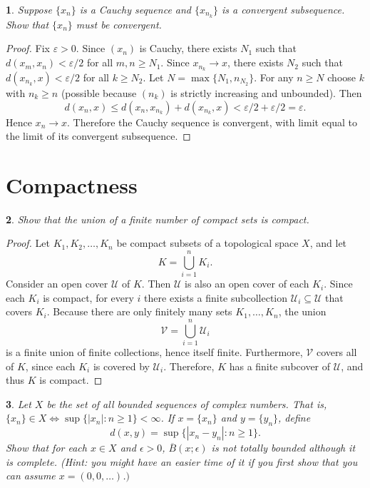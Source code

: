 \documentclass[12pt, a4paper]{report}
\theoremstyle{spaced}
\newtheorem{exercise}{}
\newcommand{\setexercise}[1]{\setcounter{exercise}{#1-1}}
\begin{document}
\setexercise{8}
\begin{exercise}
	Suppose $\{x_n\}$ is a Cauchy sequence and $\{x_{n_k}\}$ is a convergent subsequence.
	Show that $\{x_n\}$ must be convergent.
\end{exercise}

\begin{proof}
	Fix $\varepsilon>0$. Since $(x_n)$ is Cauchy, there exists $N_1$ such that
	$d(x_m,x_n)<\varepsilon/2$ for all $m,n\ge N_1$.
	Since $x_{n_k}\to x$, there exists $N_2$ such that
	$d(x_{n_k},x)<\varepsilon/2$ for all $k\ge N_2$.
	Let $N=\max\{N_1,n_{N_2}\}$. For any $n\ge N$ choose $k$ with $n_k\ge n$
	(possible because $(n_k)$ is strictly increasing and unbounded). Then
	\[
		d(x_n,x)\le d(x_n,x_{n_k})+d(x_{n_k},x)
		< \varepsilon/2+\varepsilon/2=\varepsilon.
	\]
	Hence $x_n\to x$. Therefore the Cauchy sequence is convergent, with limit equal
	to the limit of its convergent subsequence.
\end{proof}

\section{Compactness}

\setexercise{4}
\begin{exercise}
	Show that the union of a finite number of compact sets is compact.
\end{exercise}

\begin{proof}
	Let \(K_1, K_2, \dots, K_n\) be compact subsets of a topological space \(X\), and let
	\[
		K = \bigcup_{i=1}^{n} K_i.
	\]
	Consider an open cover \(\mathcal{U}\) of \(K\).
	Then \(\mathcal{U}\) is also an open cover of each \(K_i\).
	Since each \(K_i\) is compact, for every \(i\) there exists a finite subcollection
	\(\mathcal{U}_i \subseteq \mathcal{U}\) that covers \(K_i\).
	Because there are only finitely many sets \(K_1, \dots, K_n\),
	the union
	\[
		\mathcal{V} = \bigcup_{i=1}^{n} \mathcal{U}_i
	\]
	is a finite union of finite collections, hence itself finite.
	Furthermore, \(\mathcal{V}\) covers all of \(K\), since each \(K_i\) is covered by \(\mathcal{U}_i\).
	Therefore, \(K\) has a finite subcover of \(\mathcal{U}\),
	and thus \(K\) is compact.
\end{proof}


\setexercise{5}
\begin{exercise}
	Let $X$ be the set of all bounded sequences of complex numbers. That is,
	$\{x_n\} \in X \iff \sup \{|x_n| : n \geq 1\} < \infty$. If $x = \{x_n\}$ and $y = \{y_n\}$, define
	\[
		d(x, y) = \sup \{|x_n - y_n| : n \geq 1\}.
	\]
	Show that for each $x \in X$ and $\epsilon > 0$, $\overline{B}(x;\epsilon)$ is not totally bounded although it is complete.
	(Hint: you might have an easier time of it if you first show that you can assume $x = (0,0,\dots)$.$)$
\end{exercise}
\end{document}
